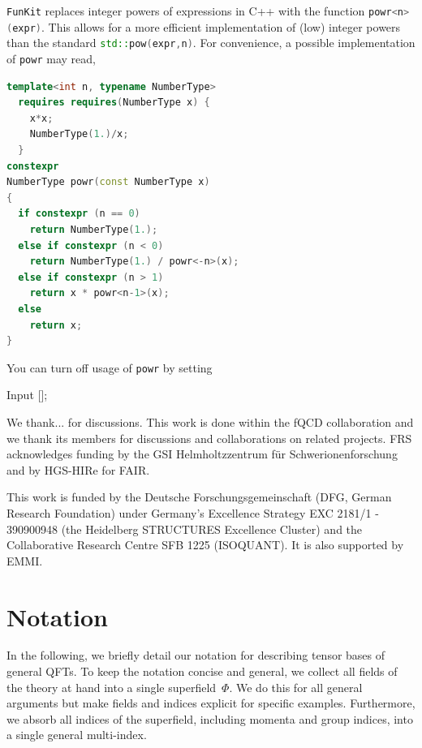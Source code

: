 \documentclass[10pt,prd,nofootinbib,superscriptaddress,twocolumn]{revtex4-2}
\newcommand{\cpp}{\lstinline[language=C++,style=myStyle]}
\newcommand{\FunKit}{\texttt{FunKit}\xspace}
\begin{document}
%
\FunKit replaces integer powers of expressions in C++ with the function \cpp{powr<n>(expr)}. This allows for a more efficient implementation of (low) integer powers than the standard \cpp{std::pow(expr,n)}. For convenience, a possible implementation of \cpp{powr} may read,
%
\begin{lstlisting}[language=c++,style=myStyle]
template<int n, typename NumberType>
  requires requires(NumberType x) {
    x*x;
    NumberType(1.)/x;
  }
constexpr
NumberType powr(const NumberType x)
{
  if constexpr (n == 0)
    return NumberType(1.);
  else if constexpr (n < 0)
    return NumberType(1.) / powr<-n>(x);
  else if constexpr (n > 1)
    return x * powr<n-1>(x);
  else
    return x;
}
\end{lstlisting}
%
You can turn off usage of \cpp{powr} by setting
%
\begin{mmaCell}{Input}
 [];
\end{mmaCell}


\begin{acknowledgments}
We thank... for discussions. This work is done within the fQCD collaboration \cite{fQCD} and we thank its members for discussions and collaborations on related projects.
FRS acknowledges funding by the GSI Helmholtzzentrum f\"ur Schwerionenforschung and by HGS-HIRe for FAIR.

This work is funded by the Deutsche Forschungsgemeinschaft (DFG, German Research Foundation) under Germany’s Excellence Strategy EXC 2181/1 - 390900948 (the Heidelberg STRUCTURES Excellence Cluster) and the Collaborative Research Centre SFB 1225 (ISOQUANT). It is also supported by EMMI.
	
	
\end{acknowledgments}

\appendix


\section{Notation}
\label{app:notation}

In the following, we briefly detail our notation for describing tensor bases of general QFTs.
To keep the notation concise and general, we collect all fields of the theory at hand into a single superfield~$\Phi$. 
We do this for all general arguments but make fields and indices explicit for specific examples.
Furthermore, we absorb all indices of the superfield, including momenta and group indices, into a single general multi-index.
\end{document}
